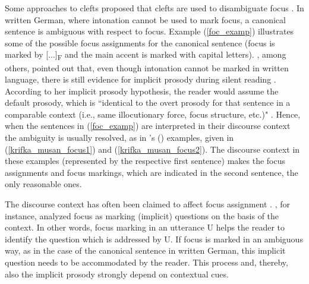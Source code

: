 \documentclass[output=paper,colorlinks,citecolor=brown]{langscibook}
\begin{document}
Some approaches to clefts proposed that clefts are used to disambiguate focus \citep[e.g.,][]{deveaugh-geiss_et_al_2015,tonnis_et_al_2018}. In written German, where intonation cannot be used to mark focus, a canonical sentence is ambiguous with respect to focus. Example (\ref{foc_examp}) illustrates some of the possible focus assignments for the canonical sentence (focus is marked by [...]\textsubscript{F} and the main accent is marked with capital letters). 
\ea\label{foc_examp}
\ex[]{
\gll [Bo hat die KEKse gegessen]\textsubscript{F}.\\
\phantom{[}Bo has the cookies eaten\\
\glt `Bo ate the cookies.'}
\z
\z
%
\citet{fodor_2002}, among others, pointed out that, even though intonation cannot be marked in written language, there is still evidence for implicit prosody during silent reading \citep[for a comprehensive overview of implicit prosody, see][ch.~9.4]{fery_2017}. According to her implicit prosody hypothesis, the reader would assume the default prosody, which is ``identical to the overt prosody for that sentence in a comparable context (i.e., same illocutionary force, focus structure, etc.)" \citep[][115]{fodor_2002}. Hence, when the sentences in (\ref{foc_examp}) are interpreted in their discourse context the ambiguity is usually resolved, as in \citeauthor{krifka_musan_2012}'s (\citeyear[][11]{krifka_musan_2012}) examples, given in (\ref{krifka_musan_focus1}) and (\ref{krifka_musan_focus2}).
\ea\label{krifka_musan}
\z
\z
The discourse context in these examples (represented by the respective first sentence) makes the focus assignments and focus markings, which are indicated in the second sentence, the only reasonable ones. 

The discourse context has often been claimed to affect focus assignment \citep[e.g.,][]{beaver_clark_2008,krifka_musan_2012,simons_et_al_2017,tonnis_2021}. \citet{krifka_musan_2012}, for instance, analyzed focus as marking (implicit) questions on the basis of the context. In other words, focus marking in an utterance U helps the reader to identify the question which is addressed by U. If focus is marked in an ambiguous way, as in the case of the canonical sentence in written German, this implicit question needs to be accommodated by the reader. This process and, thereby, also the implicit prosody strongly depend on contextual cues. 
\end{document}
